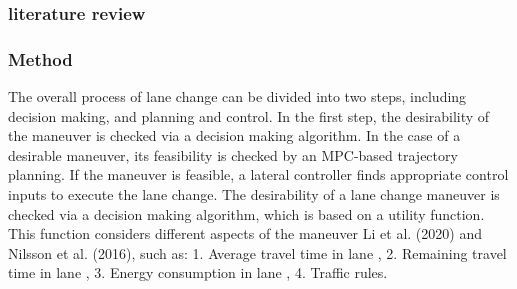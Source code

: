 \documentclass{article}
\begin{document}
  \subsubsection{literature review}
\subsubsection{Method}
The overall process of lane change can be divided into two steps,
including decision making, and planning and control. In the first step,
the desirability of the maneuver is checked via a decision making
algorithm. In the case of a desirable maneuver, its feasibility is checked
by an MPC-based trajectory planning. If the maneuver is feasible, a
lateral controller finds appropriate control inputs to execute the lane
change.
%
The desirability of a lane change maneuver is checked via a decision
making algorithm, which is based on a utility function. This function
considers different aspects of the maneuver Li et al. (2020) and Nilsson
et al. (2016), such as:
1. Average travel time in lane ,
2. Remaining travel time in lane ,
3. Energy consumption in lane ,
4. Traffic rules.
\end{document}
